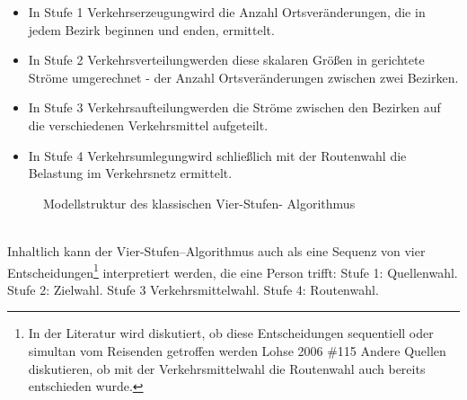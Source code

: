 \begin{itemize}
%
   \item In Stufe 1 \glqq Verkehrserzeugung\grqq  wird die Anzahl Ortsveränderungen, die in jedem Bezirk beginnen und enden, ermittelt. 
   \item In Stufe 2 \glqq Verkehrsverteilung\grqq  werden diese skalaren Größen in gerichtete Ströme umgerechnet - der Anzahl Ortsveränderungen zwischen zwei Bezirken. 
   \item In Stufe 3 \glqq Verkehrsaufteilung\grqq  werden die Ströme zwischen den Bezirken auf die verschiedenen Verkehrsmittel aufgeteilt. 
   \item In Stufe 4 \glqq Verkehrsumlegung\grqq  wird schließlich mit der Routenwahl die Belastung im Verkehrsnetz ermittelt.
%
\end{itemize}

\begin{figure}[htbp]
  \centering
  \caption{ Modellstruktur des klassischen Vier-Stufen- Algorithmus }
  \label{_Ref361867601}
\end{figure}
~\\
Inhaltlich kann der Vier-Stufen–Algorithmus auch als eine Sequenz von vier Entscheidungen\footnote{%
 In der Literatur wird diskutiert, ob diese Entscheidungen sequentiell oder simultan vom Reisenden getroffen werden {Lohse 2006 \#115} \autocites[][]{bib.213} Andere Quellen diskutieren, ob mit der Verkehrsmittelwahl die Routenwahl auch bereits entschieden wurde.
}%
 interpretiert werden, die eine Person trifft: Stufe 1: Quellenwahl. Stufe 2: Zielwahl. Stufe 3 Verkehrsmittelwahl. Stufe 4: Routenwahl.~\\


% 

